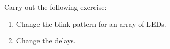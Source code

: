 







\begin{exercise}
  Carry out the following exercise:
  \begin{enumerate}
    \item Change the blink pattern for an array of LEDs.
    \item Change the delays.
  \end{enumerate}
\end{exercise}

